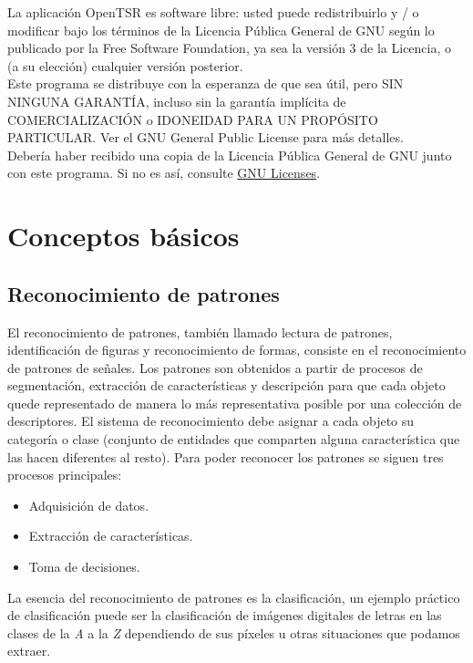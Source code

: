 \documentclass[a4paper,12pt]{article}
\begin{document}
La aplicación OpenTSR es software libre: usted puede redistribuirlo y / o modificar bajo los términos de la Licencia Pública General de GNU según lo publicado por la Free Software Foundation, ya sea la versión 3 de la Licencia, o (a su elección) cualquier versión posterior.\\

Este programa se distribuye con la esperanza de que sea útil, pero SIN NINGUNA GARANTÍA, incluso sin la garantía implícita de COMERCIALIZACIÓN o IDONEIDAD PARA UN PROPÓSITO PARTICULAR. Ver el GNU General Public License para más detalles.\\

Debería haber recibido una copia de la Licencia Pública General de GNU junto con este programa. Si no es así, consulte \href{http://www.gnu.org/licenses/}{GNU Licenses}.\\

\section{Conceptos básicos}

\subsection{Reconocimiento de patrones}

El reconocimiento de patrones, también llamado lectura de patrones, identificación de figuras y reconocimiento de formas, consiste en el reconocimiento de patrones de señales. Los patrones son obtenidos a partir de procesos de segmentación, extracción de características y descripción para que cada objeto quede representado de manera lo más representativa posible por una colección de descriptores. El sistema de reconocimiento debe asignar a cada objeto su categoría o clase (conjunto de entidades que comparten alguna característica que las hacen diferentes al resto). Para poder reconocer los patrones se siguen tres procesos principales:

\begin{itemize}
 \item Adquisición de datos.
 \item Extracción de características.
 \item Toma de decisiones.
\end{itemize}

La esencia del reconocimiento de patrones es la clasificación, un ejemplo práctico de clasificación puede ser la clasificación de imágenes digitales de letras en las clases de la \emph{A} a la \emph{Z} dependiendo de sus píxeles u otras situaciones que podamos extraer.\\
\end{document}
